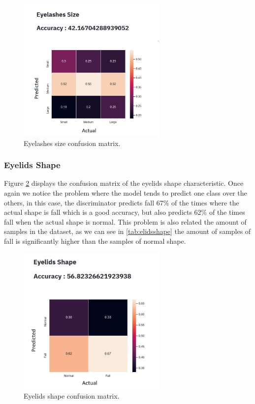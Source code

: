 \documentclass[12pt,a4paper,oneside]{memoir}
\begin{document}
\begin{figure}[H]
\centering
\includegraphics[width=0.65\textwidth]{images/eyelashes_lock_size.png}
\caption{Eyelashes size confusion matrix.}
\centering
\label{fig:eyelashes_lock_size}
\end{figure}


\subsubsection{Eyelids Shape}
Figure \ref{fig:eyelids_lock_shape} displays the confusion matrix of the eyelids shape characteristic.
Once again we notice the problem where the model tends to predict one class over the others, in this case, the discriminator predicts fall 67\% of the times where the actual shape is fall which is a good accuracy, but also predicts 62\% of the times fall when the actual shape is normal. This problem is also related the amount of samples in the dataset, as we can see in \ref{tab:elidsshape} the amount of samples of fall is significantly higher than the samples of normal shape.

\begin{figure}[H]
\centering
\includegraphics[width=0.65\textwidth]{images/eyelids_lock_shape.png}
\caption{Eyelids shape confusion matrix.}
\centering
\label{fig:eyelids_lock_shape}
\end{figure}
\end{document}
